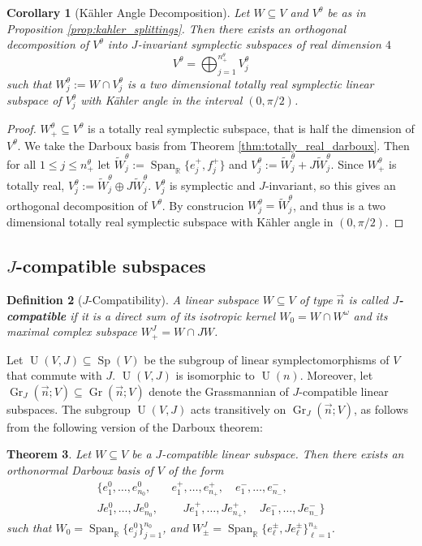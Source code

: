 \documentclass[12pt, final]{article}
\def\R{\mathbb{R}}
\def\Span{\operatorname{Span}}
\def\Sp{\operatorname{Sp}}
\def\U{\operatorname{U}}
\def\Gr{\operatorname{Gr}}
\newtheorem{theorem}{Theorem}[section]
\newtheorem{definition}[theorem]{Definition}
\newtheorem{corollary}[theorem]{Corollary}
\begin{document}
\begin{corollary}[K\"{a}hler Angle Decomposition] \label{cor:kahler_decomp} Let $W \subseteq V$ and $V^\theta$ be as in Proposition \ref{prop:kahler_splittings}. Then there exists an orthogonal decomposition of $V^\theta$ into $J$-invariant symplectic subspaces of real dimension $4$
\[ V^\theta  = \bigoplus_{j = 1}^{n_+^\theta} V^\theta_j\]
such that $W_j^\theta := W \cap V_j^\theta$ is a two dimensional  totally real symplectic linear subspace of $V_j^\theta$ with K\"{a}hler angle in the interval $(0, \pi/2)$.
\end{corollary}

\begin{proof}
$W_+^\theta \subseteq V^\theta$ is a totally real symplectic subspace, that is half the dimension of $V^\theta$. We take the Darboux basis from Theorem \ref{thm:totally_real_darboux}. Then for all $1 \le j \le n_+^\theta$ let $\widetilde{W}_j^\theta := \Span_\R\{ e_j^+, f_j^+\}$ and $V_j^\theta := \widetilde{W}_j^\theta + J\widetilde{W}_j^\theta$. Since $W_+^\theta$ is totally real, $V_j^\theta := \widetilde{W}_j^\theta \oplus J\widetilde{W}_j^\theta$. $V_j^\theta$ is symplectic and $J$-invariant, so this gives an orthogonal decomposition of $V^\theta$. By construcion $W_j^\theta =\widetilde{W}_j^\theta$, and thus is a two dimensional totally real symplectic subspace with K\"{a}hler angle in $(0, \pi/2)$.
\end{proof}

\subsection{$J$-compatible subspaces} \label{subsec:unitary}

\begin{definition}[$J$-Compatibility]
A linear subspace $W \subseteq V$ of type $\vec{n}$ is called \textbf{$J$-compatible} if it is a direct sum of its isotropic kernel $W_0 = W \cap W^\omega$ and its maximal complex subspace $W_+^J = W \cap JW$.
\end{definition}

Let $\U(V, J) \subseteq \Sp(V)$ be the subgroup of linear symplectomorphisms of $V$ that commute with $J$. $\U(V, J)$ is isomorphic to $\U(n)$. Moreover, let $\Gr_J(\vec{n}; V) \subseteq \Gr(\vec{n}; V)$ denote the Grassmannian of $J$-compatible linear subspaces. The subgroup $\U(V, J)$ acts transitively on $\Gr_J(\vec{n}; V)$, as follows from the following version of the Darboux theorem:

\begin{theorem}\label{thm:Jcompatible_darboux}
Let $W \subseteq V$ be a $J$-compatible linear subspace. Then there exists an orthonormal Darboux basis of $V$ of the form
\begin{align*}
\{e_1^0, \dots, e_{n_0}^0,\quad&  e_1^+, \dots, e_{n_+}^+,\quad  e_1^-, \dots, e_{n_-}^-,\\ Je_1^0, \dots, Je_{n_0}^0,&\quad   Je_1^+, \dots, Je_{n_+}^+,\quad Je_1^-, \dots, Je_{n_-}^-\}
\end{align*}
such that $W_0 = \Span_\R\{ e_j^0\}_{j = 1}^{n_0}$, and $W_\pm^J = \Span_\R\{e^\pm_{\ell}, Je^\pm_{\ell}\}_{\ell = 1}^{n_\pm}$.
\end{theorem}
\end{document}
